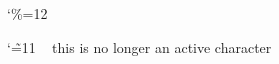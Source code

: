 {
    \catcode`\%=12
    {


        \catcode`\~=11
        ~ this is no longer an active character
    }
}
\bye
